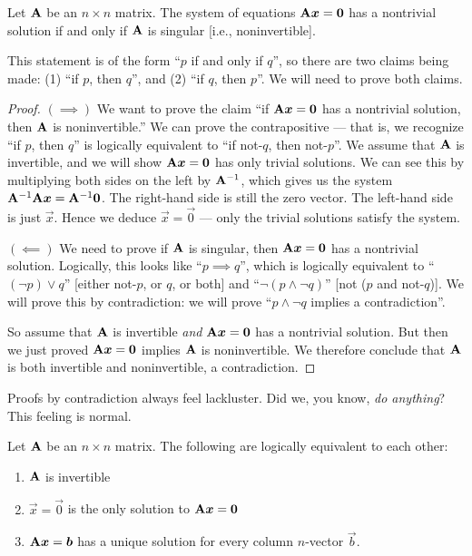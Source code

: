\begin{theorem}
Let $\mathbf{A}$ be an $n\times n$ matrix.
The system of equations $\mathbf{A}\boldsymbol{x}=\boldsymbol{0}$
has a nontrivial solution if and only if $\mathbf{A}$ is singular [i.e.,
  noninvertible]. 
\end{theorem}

This statement is of the form ``$p$ if and only if $q$'', so there are
two claims being made: (1) ``if $p$, then $q$'', and (2) ``if $q$, then $p$''.
We will need to prove both claims.

\begin{proof}
$(\implies)$ We want to prove the claim ``if $\mathbf{A}\boldsymbol{x}=\boldsymbol{0}$
  has a nontrivial solution, then $\mathbf{A}$ is noninvertible.''
  We can prove the contrapositive --- that is, we recognize ``if $p$,
  then $q$'' is logically equivalent to ``if not-$q$, then not-$p$''.
  We assume that $\mathbf{A}$ is invertible, and we will show
  $\mathbf{A}\boldsymbol{x}=\boldsymbol{0}$ has only trivial solutions. We can see this
  by multiplying both sides on the left by $\mathbf{A}^{-1}$, which gives
  us the system $\mathbf{A}^{-1}\mathbf{A}\boldsymbol{x} = \mathbf{A}^{-1}\boldsymbol{0}$.
  The right-hand side is still the zero vector. The left-hand side is
  just $\vec{x}$. Hence we deduce $\vec{x}=\vec{0}$ --- only the trivial
  solutions satisfy the system.

$(\impliedby)$ We need to prove if $\mathbf{A}$ is singular, then
  $\mathbf{A}\boldsymbol{x}=\boldsymbol{0}$ has a nontrivial solution. Logically, this
  looks like ``$p\implies q$'', which is logically equivalent to ``$(\neg p)\lor{q}$''
  [either not-$p$, or $q$, or both]
  and ``$\neg(p\land\neg{q})$'' [not ($p$ and not-$q$)].
  We will prove this by contradiction: we will prove ``$p\land\neg{q}$
  implies a contradiction''.

  So assume that $\mathbf{A}$ is invertible \emph{and}
  $\mathbf{A}\boldsymbol{x}=\boldsymbol{0}$ has a nontrivial solution. But then we just
  proved $\mathbf{A}\boldsymbol{x}=\boldsymbol{0}$ implies $\mathbf{A}$ is noninvertible. We
  therefore conclude that $\mathbf{A}$ is both invertible and
  noninvertible, a contradiction.
\end{proof}

\begin{remark}
Proofs by contradiction always feel lackluster. Did we, you know,
\emph{do anything}? This feeling is normal.
\end{remark}

Let $\mathbf{A}$ be an $n\times n$ matrix. The following are logically
equivalent to each other:
\begin{enumerate}
\item $\mathbf{A}$ is invertible
\item $\vec{x}=\vec{0}$ is the only solution to $\mathbf{A}\boldsymbol{x}=\boldsymbol{0}$
\item $\mathbf{A}\boldsymbol{x}=\boldsymbol{b}$ has a unique solution for every column
  $n$-vector $\vec{b}$.
\end{enumerate}

